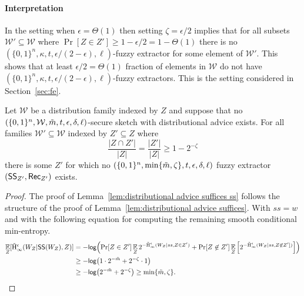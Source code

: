 \paragraph{Interpretation} 
%
In the setting when $\epsilon = \Theta(1)$ then setting $\zeta = \epsilon/2$ implies that for all subsets $\mathcal{W}' \subseteq \mathcal{W}$ where $\Pr[Z\in Z']\ge 1-\epsilon/2 = 1-\Theta(1)$ there is no $(\{0,1\}^n,\kappa, t, \epsilon/(2-\epsilon), \ell)$-fuzzy extractor for some element of $\mathcal{W}'$.  This shows that at least $\epsilon/2=\Theta(1)$ fraction of elements in $\mathcal{W}$ do not have $(\{0,1\}^n,\kappa, t, \epsilon/(2-\epsilon), \ell)$-fuzzy extractors. This is the setting considered in Section~\ref{sec:fe}.


\begin{lemma}
Let $\mathcal{W}$ be a distribution family indexed by $Z$ and suppose that no $(\{0, 1\}^n, \mathcal{W}, \tilde{m}, t, \epsilon, \delta, \ell)$-secure sketch with distributional advice exists.  For all families $\mathcal{W}'\subseteq \mathcal{W}$ indexed by $Z'\subseteq Z$ where\[\frac{|Z\cap Z'|}{|Z|} = \frac{|Z'|}{|Z|}\ge 1-2^{-\zeta}\]
there is some $Z'$ for which no  $(\{0, 1\}^n, \min\{\tilde{m}, \zeta\}, t, \epsilon, \delta, \ell)$ fuzzy extractor $({\mathsf{SS}}_{Z'}, {\mathsf{Rec}}_{Z'})$  exists.
\label{lem:distributional advice suffices ss}
\end{lemma}

\begin{proof}
The proof of Lemma~\ref{lem:distributional advice suffices ss} follows the structure of the proof of Lemma~\ref{lem:distributional advice suffices}.  With $ss=w$ and with the following equation for computing the remaining smooth conditional min-entropy.
\begin{align*}
\operatorname*{\mathbb{E}}_{Z} [\tilde{\mathrm{H}}_\infty^\epsilon(W_Z| {\mathsf{SS}}(W_Z), Z)] &= -\mathsf{log}\!\left(\Pr[Z\in Z']\operatorname*{\mathbb{E}}_{Z} 2^{-\tilde{\mathrm{H}}_\infty^\epsilon(W_Z| ss, Z\in Z')}+ \Pr[Z\not\in Z']\operatorname*{\mathbb{E}}_{Z}\left[ 2^{-\tilde{\mathrm{H}}_\infty^\epsilon(W_Z| ss, Z\not\in Z'] )}\right]\right)\\
&\ge -\mathsf{log}\!\left(1 \cdot 2^{-\tilde{m}}+ 2^{-\zeta}\cdot 1\right)\\
&\ge -\mathsf{log}\!\left(2^{-\tilde{m}}+2^{-\zeta}\right)  \ge \min\{\tilde{m},\zeta\}.
\end{align*}
\end{proof}

